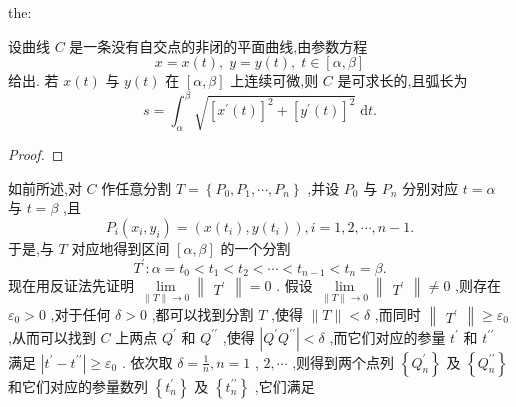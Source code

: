 \begin{theorem}{}{the:}

\end{theorem}
 设曲线 \(C\) 是一条没有自交点的非闭的平面曲线,由参数方程
\[
x = x\left( t\right) ,\;y = y\left( t\right) ,\;t \in  \left\lbrack  {\alpha ,\beta }\right\rbrack   \tag{1}
\]
给出. 若 \(x\left( t\right)\) 与 \(y\left( t\right)\) 在 \(\left\lbrack  {\alpha ,\beta }\right\rbrack\) 上连续可微,则 \(C\) 是可求长的,且弧长为
\[
s = {\int }_{\alpha }^{\beta }\sqrt{{\left\lbrack  {x}^{\prime }\left( t\right) \right\rbrack  }^{2} + {\left\lbrack  {y}^{\prime }\left( t\right) \right\rbrack  }^{2}}\mathrm{\;d}t. \tag{2}
\]
\begin{proof}

\end{proof}
如前所述,对 \(C\) 作任意分割 \(T = \left\{  {{P}_{0},{P}_{1},\cdots ,{P}_{n}}\right\}\) ,并设 \({P}_{0}\) 与 \({P}_{n}\) 分别对应 \(t = \alpha\) 与 \(t = \beta\) ,且
\[
{P}_{i}\left( {{x}_{i},{y}_{i}}\right)  = \left( {x\left( {t}_{i}\right) ,y\left( {t}_{i}\right) }\right) ,i = 1,2,\cdots ,n - 1.
\]
于是,与 \(T\) 对应地得到区间 \(\left\lbrack  {\alpha ,\beta }\right\rbrack\) 的一个分割
\[
{T}^{\prime } : \alpha  = {t}_{0} < {t}_{1} < {t}_{2} < \cdots  < {t}_{n - 1} < {t}_{n} = \beta .
\]
现在用反证法先证明 \(\mathop{\lim }\limits_{{\parallel T\parallel  \rightarrow  0}}\begin{Vmatrix}{T}^{\prime }\end{Vmatrix} = 0\) . 假设 \(\mathop{\lim }\limits_{{\parallel T\parallel  \rightarrow  0}}\begin{Vmatrix}{T}^{\prime }\end{Vmatrix} \neq  0\) ,则存在 \({\varepsilon }_{0} > 0\) ,对于任何 \(\delta  > 0\) ,都可以找到分割 \(T\) ,使得 \(\parallel T\parallel  < \delta\) ,而同时 \(\begin{Vmatrix}{T}^{\prime }\end{Vmatrix} \geq  {\varepsilon }_{0}\) ,从而可以找到 \(C\) 上两点 \({Q}^{\prime }\) 和 \({Q}^{\prime \prime }\) ,使得 \(\left| {{Q}^{\prime }{Q}^{\prime \prime }}\right|  < \delta\) ,而它们对应的参量 \({t}^{\prime }\) 和 \({t}^{\prime \prime }\) 满足 \(\left| {{t}^{\prime } - {t}^{\prime \prime }}\right|  \geq  {\varepsilon }_{0}\) . 依次取 \(\delta  = \frac{1}{n},n = 1\) , \(2,\cdots\) ,则得到两个点列 \(\left\{  {Q}_{n}^{\prime }\right\}\) 及 \(\left\{  {Q}_{n}^{\prime \prime }\right\}\) 和它们对应的参量数列 \(\left\{  {t}_{n}^{\prime }\right\}\) 及 \(\left\{  {t}_{n}^{\prime \prime }\right\}\) ,它们满足
